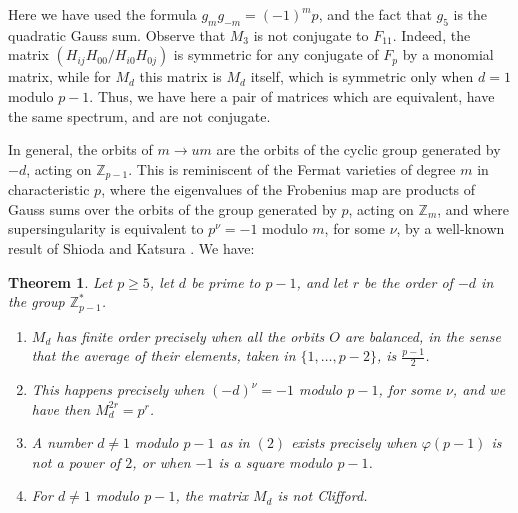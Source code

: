 \documentclass[11pt]{amsart}
\newtheorem{theorem}{Theorem}[section]
\theoremstyle{definition}
\begin{document}
Here we have used the formula $g_mg_{-m}=(-1)^mp$, and the fact that $g_5$ is the quadratic Gauss sum. Observe that $M_3$ is not conjugate to $F_{11}$. Indeed, the matrix $(H_{ij}H_{00}/H_{i0}H_{0j})$ is symmetric for any conjugate of $F_p$ by a monomial matrix, while for $M_d$ this matrix is $M_d$ itself, which is symmetric only when $d=1$ modulo $p-1$. Thus, we have here a pair of matrices which are equivalent, have the same spectrum, and are not conjugate.

\medskip

In general, the orbits of $m\to um$ are the orbits of the cyclic group generated by $-d$, acting on $\mathbb Z_{p-1}$. This is reminiscent of the Fermat varieties of degree $m$ in characteristic $p$, where the eigenvalues of the Frobenius map are products of Gauss sums over the orbits of the group generated by $p$, acting on $\mathbb Z_m$, and where supersingularity is equivalent to $p^\nu=-1$ modulo $m$, for some $\nu$, by a well-known result of Shioda and Katsura \cite{ska}. We have:

\begin{theorem}\label{tpow}
Let $p\geq5$, let $d$ be prime to $p-1$, and let $r$ be the order of $-d$ in the group $\mathbb Z_{p-1}^*$.
\begin{enumerate}
\item $M_d$ has finite order precisely when all the orbits $O$ are balanced, in the sense that the average of their elements, taken in $\{1,\ldots,p-2\}$, is $\frac{p-1}{2}$.

\item This happens precisely when $(-d)^\nu=-1$ modulo $p-1$, for some $\nu$, and we have then $M_d^{2r}=p^r$.

\item A number $d\neq1$ modulo $p-1$ as in $(2)$ exists precisely when $\varphi(p-1)$ is not a power of $2$, or when $-1$ is a square modulo $p-1$.

\item For $d\neq1$ modulo $p-1$, the matrix $M_d$ is not Clifford.
\end{enumerate}
\end{theorem}
\end{document}
